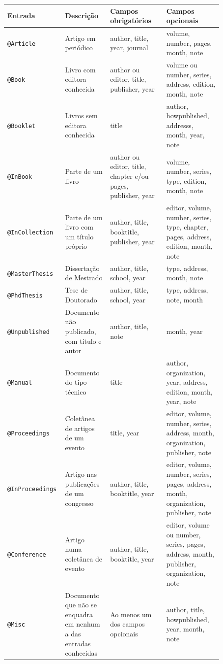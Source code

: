 \documentclass[fleqn]{icat-ufal}
\begin{document}
\begin{small}%
\begin{spacing}{1}
\begin{longtable}{p{0.17\linewidth}p{0.2\linewidth}p{0.25\linewidth}p{0.25\linewidth}} \hline
  \textbf{Entrada}             &
  \textbf{Descrição}           &
  \textbf{Campos obrigatórios} &
  \textbf{Campos opcionais}    \\
  \hline \endhead
  \hline \endfoot
  \lstinline|@Article| & 
  Artigo em periódico &
  author, title, year, journal &
  volume, number, pages, month, note 
  \\[4mm]
  \lstinline|@Book| & 
  Livro com editora conhecida &
  author ou editor, title, publisher, year &
  volume ou number, series, address, edition, month, note 
  \\[4mm]
  \lstinline|@Booklet| & 
  Livros sem editora conhecida &
  title &
  author, howpublished, addresss, month, year, note 
  \\[4mm]
  \lstinline|@InBook| & 
  Parte de um livro &
  author ou editor, title, chapter e/ou pages, publisher, year & 
  volume, number, series, type, edition, month, note 
  \\[4mm]
  \lstinline|@InCollection| & 
  Parte de um livro com um título próprio &
  author, title, booktitle, publisher, year & 
  editor, volume, number, series, type, chapter, pages, address, edition, month, note 
  \\[4mm]
  \lstinline|@MasterThesis| & 
  Dissertação de Mestrado &
  author, title, school, year & 
  type, address, month, note 
  \\[4mm]
  \lstinline|@PhdThesis| & 
  Tese de Doutorado &
  author, title, school, year & 
  type, address, note, month 
  \\[4mm]
  \lstinline|@Unpublished| & 
  Documento não publicado, com título e autor&
  author, title, note &
  month, year 
  \\[4mm]
  \lstinline|@Manual| & 
  Documento do tipo técnico &
  title &
  author, organization, year, address, edition, month, year, note 
  \\[4mm]
  \lstinline|@Proceedings| & 
  Coletânea de artigos de um evento &
  title, year & 
  editor, volume, number, series, address, month, organization, publisher, note 
  \\[4mm]
  \lstinline|@InProceedings| & 
  Artigo nas publicações de um congresso &
  author, title, booktitle, year & 
  editor, volume, number, series, pages, address, month, organization, publisher, note 
  \\[4mm]
  \lstinline|@Conference| & 
  Artigo numa coletânea de evento &
  author, title, booktitle, year & 
  editor, volume ou number, series, pages, address, month, publisher, organization, note 
  \\[4mm]
  \lstinline|@Misc| & 
  Documento que não se enquadra em nenhum a das entradas conhecidas &
  Ao menos um dos campos opcionais &
  author, title, howpublished, year, month, note 
\end{longtable}%
\end{spacing}
\end{small}
\end{document}
